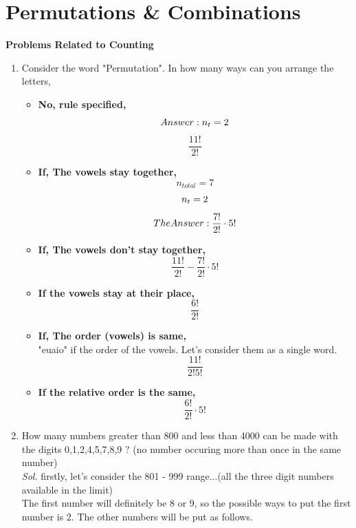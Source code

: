 \documentclass{book}
\begin{document}
\section{Permutations \& Combinations}
\textbf{Problems Related to Counting}
\begin{enumerate}
	\item Consider the word "Permutation". In how many ways can you arrange the letters,\\
	      \begin{itemize}
		      \item \textbf{No, rule specified,}\\
		            \[
			            Answer: \space n_t=2
		            \]
		            \[
			            \frac{11!}{2!}
		            \]
		      \item \textbf{If, The vowels stay together,\\}
		            \[
			            n_{total} = 7
		            \]
		            \[
			            n_t=2\\
		            \]
		            \[
			            The \space Answer:\space \frac{7!}{2!}\cdot 5!
		            \]
		      \item \textbf{If, The vowels don't stay together,\\}
		            \[
			            \frac{11!}{2!}-\frac{7!}{2!}\cdot 5!
		            \]
		      \item \textbf{If the vowels stay at their place,}\\
		            \[
			            \frac{6!}{2!}
		            \]
		      \item \textbf{If, The order (vowels) is same,}\\
		            "euaio" if the order of the vowels. Let's consider them as a single word.
		            \[
			            \frac{11!}{2!5!}
		            \]
		      \item \textbf{If the relative order is the same,}\\
		            \[
			            \frac{6!}{2!}\cdot 5!
		            \]
	      \end{itemize}
	\item How many numbers greater than 800 and less than 4000 can be made with the digits 0,1,2,4,5,7,8,9 ? (no number occuring more than once in the same number)\\
	      \textit{ Sol. }
	      firstly, let's consider the 801 - 999 range...(all the three digit numbers available in the limit)\\
	      The first number will definitely be 8 or 9, so the possible ways to put the first number is 2. The other numbers will be put as follows.

\end{enumerate}
\end{document}
